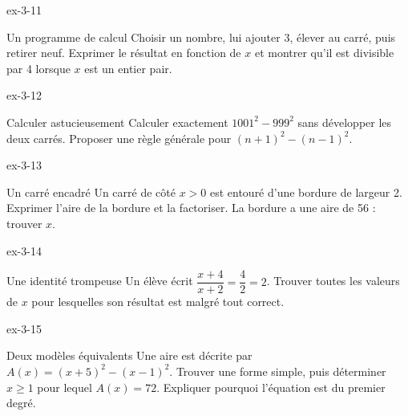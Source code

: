 \clearpage{}
\begin{blocLivre}{ex-3-11}
\begin{exercice}[3]{Un programme de calcul}
Choisir un nombre, lui ajouter 3, élever au carré, puis retirer neuf. Exprimer le résultat en fonction de $x$ et montrer qu’il est divisible par 4 lorsque $x$ est un entier pair.
\end{exercice}
\end{blocLivre}
\begin{blocLivre}{ex-3-12}
\begin{exercice}[3]{Calculer astucieusement}
Calculer exactement $1001^2-999^2$ sans développer les deux carrés. Proposer une règle générale pour $(n+1)^2-(n-1)^2$.
\end{exercice}
\end{blocLivre}
\begin{blocLivre}{ex-3-13}
\begin{exercice}[3]{Un carré encadré}
Un carré de côté $x>0$ est entouré d’une bordure de largeur 2. Exprimer l’aire de la bordure et la factoriser. La bordure a une aire de 56 : trouver $x$.
\label{fig-ex-3-13}
\end{exercice}
\end{blocLivre}
\begin{blocLivre}{ex-3-14}
\begin{exercice}[3]{Une identité trompeuse}
Un élève écrit $\dfrac{x+4}{x+2}=\dfrac42=2$. Trouver toutes les valeurs de $x$ pour lesquelles son résultat est malgré tout correct.
\end{exercice}
\end{blocLivre}
\begin{blocLivre}{ex-3-15}
\begin{exercice}[3]{Deux modèles équivalents}
Une aire est décrite par $A(x)=(x+5)^2-(x-1)^2$. Trouver une forme simple, puis déterminer $x\ge1$ pour lequel $A(x)=72$. Expliquer pourquoi l’équation est du premier degré.
\end{exercice}
\end{blocLivre}

\clearpage
